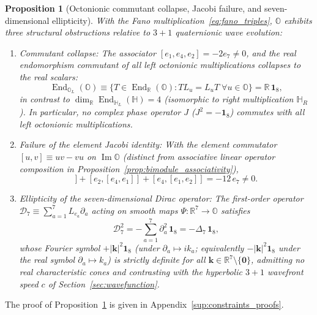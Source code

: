 \documentclass[aps,prd,onecolumn,tightenlines,nofootinbib,notitlepage,11pt,floatfix]{revtex4-2}
\theoremstyle{indentedtheorem}
\newtheorem{proposition}{Proposition}
\begin{document}
\begin{proposition}[Octonionic commutant collapse, Jacobi failure, and seven-dimensional ellipticity]
\label{prop:oct_obstructions}
With the Fano multiplication~\eqref{eq:fano_triples}, $\mathbb{O}$ exhibits three structural obstructions relative to $3+1$ quaternionic wave evolution:
\begin{enumerate}[label=(\roman*)]
\item \emph{Commutant collapse:} The associator $[e_1,e_4,e_2] = -2e_7\neq 0$, and the real endomorphism commutant of all left octonionic multiplications collapses to the real scalars:
\begin{equation}
    \operatorname{End}_{\mathbb{O}_L}(\mathbb{O}) \equiv \big\{ T\in\operatorname{End}_{\mathbb{R}}(\mathbb{O}) : T L_u = L_u T \;\forall u\in\mathbb{O} \big\} = \mathbb{R}\,\mathbf{1}_8 ,
    \label{eq:commutant_collapse}
\end{equation}
in contrast to $\dim_{\mathbb{R}}\operatorname{End}_{\mathbb{H}_L}(\mathbb{H}) = 4$ (isomorphic to right multiplication $\mathbb{H}_R$). In particular, no complex phase operator $J$ ($J^2=-\mathbf{1}_8$) commutes with all left octonionic multiplications.
\item \emph{Failure of the element Jacobi identity:} With the element commutator $[u,v]\equiv uv-vu$ on $\operatorname{Im}\mathbb{O}$ (distinct from associative linear operator composition in Proposition~\ref{prop:bimodule_associativity}),
\begin{equation}
    [e_1,[e_2,e_4]] + [e_2,[e_4,e_1]] + [e_4,[e_1,e_2]] = -12\,e_7 \neq 0 .
    \label{eq:oct_jacobi_fail}
\end{equation}
\item \emph{Ellipticity of the seven-dimensional Dirac operator:} The first-order operator $\mathcal{D}_7 \equiv \sum_{a=1}^7 L_{e_a}\partial_a$ acting on smooth maps $\Psi:\mathbb{R}^7\to\mathbb{O}$ satisfies
\begin{equation}
    \mathcal{D}_7^2 = -\sum_{a=1}^7 \partial_a^2\,\mathbf{1}_8 = -\Delta_7\,\mathbf{1}_8 ,
    \label{eq:d7_elliptic}
\end{equation}
whose Fourier symbol $+|\mathbf{k}|^2\mathbf{1}_8$ (under $\partial_a\mapsto ik_a$; equivalently $-|\mathbf{k}|^2\mathbf{1}_8$ under the real symbol $\partial_a\mapsto k_a$) is strictly definite for all $\mathbf{k}\in\mathbb{R}^7\setminus\{\mathbf{0}\}$, admitting no real characteristic cones and contrasting with the hyperbolic $3+1$ wavefront speed $c$ of Section~\ref{sec:wavefunction}.
\end{enumerate}
\end{proposition}
\noindent The proof of Proposition~\ref{prop:oct_obstructions} is given in Appendix~\ref{sup:constraints_proofs}.
\end{document}
